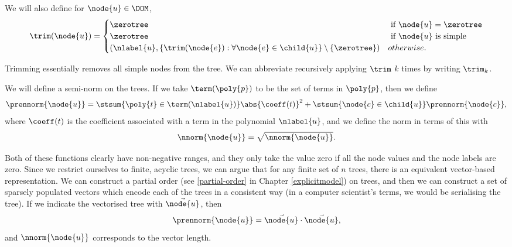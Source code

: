 \begin{definition}
  We will also define for $\node{u} \in \DOM$,
  \begin{align}
    \trim(\node{u}) = \begin{cases}
      \zerotree & \text{ if } \node{u} = \zerotree \\
      \zerotree & \text{ if } \node{u} \text{ is simple} \\
      (\nlabel{u}, \lbrace \trim(\node{e}): \forall\node{e}\in\child{u} \rbrace \setminus \{\zerotree\}) & otherwise.
    \end{cases}
  \end{align}
\end{definition}

Trimming essentially removes all simple nodes from the tree.  We can
abbreviate recursively applying $\trim$ $k$ times by writing
$\trim_{k}$.

\begin{definition}\label{treenorm}
  We will define a semi-norm on the trees. 
  If we take $\term(\poly{p})$ to be the set of terms in $\poly{p}$,
  then we define
  \begin{equation}
    \prennorm{\node{u}}={\stsum{\poly{t}\in\term(\nlabel{u})}\abs{\coeff({t})}^2+\stsum{\node{c}\in\child{u}}\prennorm{\node{c}}},
  \end{equation}
  where $\coeff(t)$ is the coefficient associated with a term in the polynomial $\nlabel{u}$,
  and we define the norm in terms of this with
  \begin{equation}
    \nnorm{\node{u}}=\sqrt{\nnorm{\node{u}}}.
  \end{equation}
\end{definition}

Both of these functions clearly have non-negative ranges, and they
only take the value zero if all the node values and the node labels
are zero.  Since we restrict ourselves to finite, acyclic trees, we
can argue that for any finite set of $n$ trees, there is an equivalent
vector-based representation. We can construct a partial order
(see \ref{partial-order} in Chapter \ref{explicitmodel}) on trees, and
then we can construct a set of sparsely populated vectors which encode
each of the trees in a consistent way (in a computer scientist's
terms, we would be serialising the tree). If we indicate the vectorised
tree  with $\vec{\node{u}}$, then
\[\prennorm{\node{u}}=\vec{\node{u}}\cdot\vec{\node{u}},\] and
$\nnorm{\node{u}}$ corresponds to the vector length.

